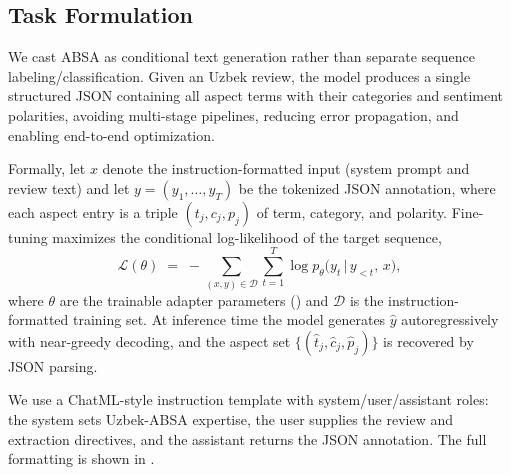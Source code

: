\documentclass[bdcc,article,submit,moreauthors]{Definitions/mdpi}
\begin{document}
\subsection{Task Formulation}
\label{sec:data_task}

We cast ABSA as conditional text generation rather than separate sequence labeling/classification. Given an Uzbek review, the model produces a single structured JSON containing all aspect terms with their categories and sentiment polarities, avoiding multi-stage pipelines, reducing error propagation, and enabling end-to-end optimization.

Formally, let $x$ denote the instruction-formatted input (system prompt and review text) and let $y = (y_1, \dots, y_T)$ be the tokenized JSON annotation, where each aspect entry is a triple $(t_j, c_j, p_j)$ of term, category, and polarity. Fine-tuning maximizes the conditional log-likelihood of the target sequence,
\begin{equation}
\label{eq:sft}
\mathcal{L}(\theta) \;=\; -\sum_{(x,y) \in \mathcal{D}} \sum_{t=1}^{T} \log p_\theta\big(y_t \,\big|\, y_{<t},\, x\big),
\end{equation}
where $\theta$ are the trainable adapter parameters () and $\mathcal{D}$ is the instruction-formatted training set. At inference time the model generates $\hat{y}$ autoregressively with near-greedy decoding, and the aspect set $\{(\hat{t}_j, \hat{c}_j, \hat{p}_j)\}$ is recovered by JSON parsing.

We use a ChatML-style instruction template with system/user/assistant roles: the system sets Uzbek-ABSA expertise, the user supplies the review and extraction directives, and the assistant returns the JSON annotation. The full formatting is shown in .
\end{document}
